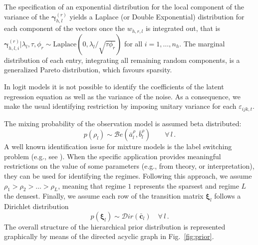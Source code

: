 \documentclass[12pt,a4paper]{article}
\def \R{\mathds{R}}
\theoremstyle{custom}
\begin{document}
The specification of an exponential distribution for the local component of the variance of the $\boldsymbol{\gamma}_{h,l}^{(r)}$ yields a Laplace (or Double Exponential) distribution for each component of the vectors once the $w_{h,r,l}$ is integrated out, that is $\boldsymbol{\gamma}_{h,l,i}^{(r)}|\lambda_l,\tau,\phi_r \sim \text{Laplace}(0,\lambda_l/\sqrt{\tau\phi_r})$ for all $i=1,\ldots,n_h$. The marginal distribution of each entry, integrating all remaining random components, is a generalized Pareto distribution, which favours sparsity.

In logit models it is not possible to identify the coefficients of the latent regression equation as well as the variance of the noise. As a consequence, we make the usual identifying restriction by imposing unitary variance for each $\varepsilon_{ijk,t}$.

The mixing probability of the observation model is assumed beta distributed:
\begin{equation}
p(\rho_l) \sim \mathcal{B}e(\bar{a}_l^\rho, \bar{b}_l^\rho) \qquad \forall \, l \, .
\label{eq:prior_rho}
\end{equation}
A well known identification issue for mixture models is the label switching problem (e.g., see \cite{Fruhwirth01LabelSwitch_PermutationSampler}). When the specific application provides meaningful restrictions on the value of some parameters (e.g., from theory, or interpretation), they can be used for identifying the regimes. Following this approach, we assume $\rho_1 > \rho_2 > \ldots > \rho_L$, meaning that regime $1$ represents the sparsest and regime $L$ the densest.
Finally, we assume each row of the transition matrix $\boldsymbol{\xi}_l$ follows a Dirichlet distribution
\begin{equation}
p(\boldsymbol{\xi}_{l}) \sim \mathcal{D}ir(\bar{\mathbf{c}}_{l}) \quad \forall \, l \, .
\label{eq:prior_xi}
\end{equation}
The overall structure of the hierarchical prior distribution is represented graphically by means of the directed acyclic graph in Fig.~\ref{fig:prior}.
\end{document}
